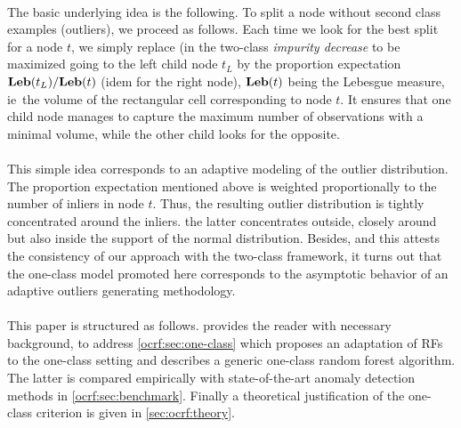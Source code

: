 \paragraph{}
The basic underlying idea is the following. To split a node without second
class examples (outliers), we proceed as follows.  Each time we look for the
best split for a node $t$, we simply replace (in the two-class \emph{impurity
decrease} to be maximized %
going to the left child node $t_L$ by the proportion expectation
$\mathbf{Leb}(t_L)/\mathbf{Leb}(t)$ (idem for the right node), $\mathbf{Leb}(t)$ being the Lebesgue
measure, \acs{ie}~the volume of the rectangular cell corresponding to node $t$.
It ensures that one child node manages to capture the maximum number of
observations with a minimal volume, while the other child looks for the
opposite. %
\paragraph{}
This simple idea corresponds to an adaptive modeling of the outlier
distribution.  The proportion expectation mentioned above is weighted
proportionally to the number of inliers in node $t$. Thus, the resulting
outlier distribution is tightly concentrated around the inliers. %
the latter concentrates outside, closely around but also inside the support of
the normal distribution.
%
Besides, and this attests the consistency of our approach with the two-class
framework, it turns out that the one-class model promoted here corresponds to
the asymptotic behavior of an adaptive %
outliers generating methodology.
\paragraph{}
This paper is structured as follows.  provides the
reader with necessary background, to address \cref{ocrf:sec:one-class} which
proposes an adaptation of \acp{RF} to the one-class setting and describes a
generic one-class random forest algorithm. The latter is compared empirically
with state-of-the-art anomaly detection methods in \cref{ocrf:sec:benchmark}.
Finally a theoretical justification of the one-class criterion is given in
\cref{sec:ocrf:theory}.


